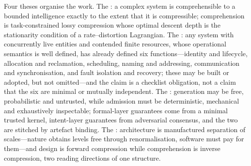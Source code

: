 \documentclass[11pt,a4paper,oneside,openany]{book}
\begin{document}
Four theses organise the work. The : a complex system is
comprehensible to a bounded intelligence exactly to the extent that it is compressible;
comprehension is task-constrained lossy compression whose optimal descent depth is the
stationarity condition of a rate--distortion Lagrangian. The : any
system with concurrently live entities and contended finite resources, whose operational
semantics is well defined, has already defined six functions---identity and lifecycle,
allocation and reclamation, scheduling, naming and addressing, communication and
synchronisation, and fault isolation and recovery; these may be built or adopted, but not
omitted---and the claim is a checklist obligation, not a claim that the six are minimal or
mutually independent. The : generation may be free, probabilistic and
untrusted, while admission must be deterministic, mechanical and exhaustively inspectable;
formal-layer
guarantees come from a minimal trusted kernel, intent-layer guarantees from adversarial
consensus, and the two are stitched by artefact binding. The :
architecture is manufactured separation of scales---nature obtains levels free through
renormalisation, software must pay for them---and design is forward compression while
comprehension is inverse compression, two reading directions of one structure.
\end{document}
